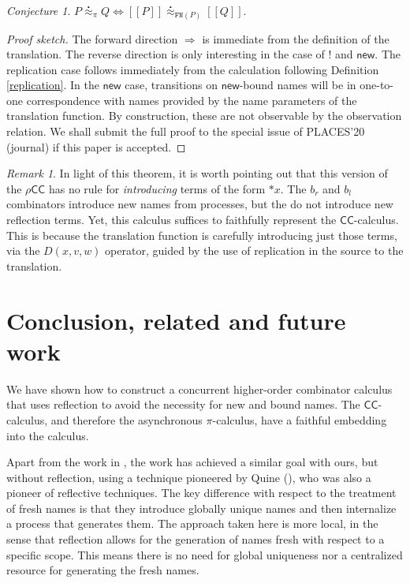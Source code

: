 \documentclass[submission,copyright,creativecommons]{eptcs}
\newcommand{\new}{\mathsf{new}}
\newcommand{\pic}{$\pi$-calculus}
\newcommand{\ccomb}{$\mathsf{CC}$-calculus}
\newcommand{\ldb}{[\![}
\newcommand{\rdb}{]\!]}
\newcommand{\wbbisim}{\stackrel{\centerdot}{\approx}} %
\newcommand{\dropn}[1]{\mathsf{*}#1}
\newcommand{\rhocc}{$\rho$$\mathsf{CC}$}
\theoremstyle{definition}
\theoremstyle{remark}
\newtheorem{remark}{Remark}
\theoremstyle{remark}
\newtheorem{conjecture}{Conjecture}
\begin{document}
\begin{conjecture} 
  $P \wbbisim_{\pi} Q \iff \ldb P \rdb \wbbisim_{\texttt{FN}(P)} \ldb Q \rdb$.
\end{conjecture}

\begin{proof}[Proof sketch]
  The forward direction $\Rightarrow$ is immediate from the definition
  of the translation. The reverse direction is only interesting in the
  case of $!$ and $\mathsf{new}$. The replication case follows immediately
  from the calculation following Definition \ref{replication}. 
  In the $\new$ case, transitions on $\mathsf{new}$-bound
  names will be in one-to-one correspondence with names provided by
  the name parameters of the translation function. By construction,
  these are not observable by the observation relation.
  We shall submit the full proof to the special issue of
  PLACES'20 (journal) if this paper is accepted.
\end{proof}

\begin{remark}
  In light of this theorem, it is worth pointing out that this version
  of the {\rhocc} has no rule for \emph{introducing} terms of
  the form $\dropn{x}$. The $b_r$ and $b_l$ combinators introduce new
  names from processes, but the do not introduce new reflection
  terms. Yet, this calculus suffices to faithfully represent the
  {\ccomb}. This is because the translation function is
  carefully introducing just those terms, via the $D(x,v,w)$ operator,
  guided by the use of replication in the source to the
  translation. 
\end{remark}

\section{Conclusion, related and future work}
We have shown how to construct a concurrent higher-order combinator
calculus that uses reflection to avoid the necessity for new and bound
names.  The {\ccomb}, and therefore the asynchronous {\pic}, have a
faithful embedding into the calculus.

Apart from the work in \cite{DBLP:conf/popl/HondaY94,DBLP:journals/tcs/Yoshida02},
the work \cite{DBLP:journals/toplas/RajaS97}
has achieved a similar goal with ours, but
without reflection, using a technique pioneered by Quine
(\cite{Quine59,Quine60}), who was also a pioneer of reflective
techniques. The key difference with respect to the treatment of fresh
names is that they introduce globally unique names and then
internalize a process that generates them. The approach taken here is
more local, in the sense that reflection allows for the generation of
names fresh with respect to a specific scope. This means there is no
need for global uniqueness nor a centralized resource for generating
the fresh names.
\end{document}
